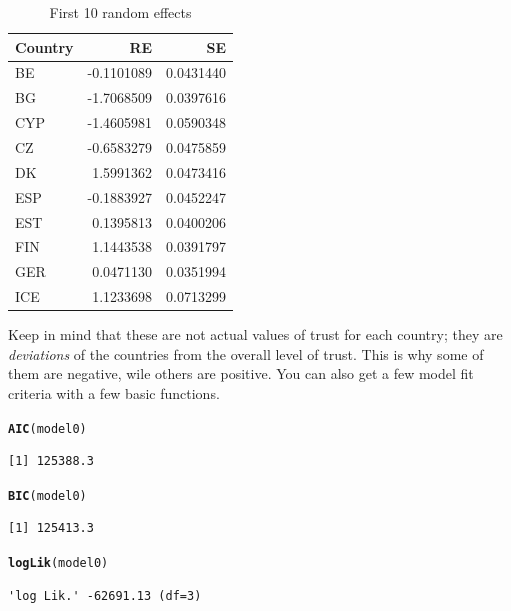 \documentclass[12pt,english]{article}\usepackage[]{graphicx}\usepackage[usenames, dvipsnames]{xcolor}
\makeatletter
\newcommand{\hlstd}[1]{\textcolor[rgb]{0.345,0.345,0.345}{#1}}%
\newcommand{\hlkwd}[1]{\textcolor[rgb]{0.737,0.353,0.396}{\textbf{#1}}}%
\newenvironment{kframe}{%
 \def\at@end@of@kframe{}%
 \ifinner\ifhmode%
  \def\at@end@of@kframe{\end{minipage}}%
  \begin{minipage}{\columnwidth}%
 \fi\fi%
 \def\FrameCommand##1{\hskip\@totalleftmargin \hskip-\fboxsep
 \colorbox{shadecolor}{##1}\hskip-\fboxsep
     \hskip-\linewidth \hskip-\@totalleftmargin \hskip\columnwidth}%
 \MakeFramed {\advance\hsize-\width
   \@totalleftmargin\z@ \linewidth\hsize
   \@setminipage}}%
 {\par\unskip\endMakeFramed%
 \at@end@of@kframe}
\newenvironment{knitrout}{}{} %
\makeatother
\begin{document}
\begin{table}[!h]

\caption{\label{tab:ch-8}First 10 random effects}
\centering
\begin{tabular}[t]{lrr}
\toprule
Country & RE & SE\\
\midrule
BE & -0.1101089 & 0.0431440\\
BG & -1.7068509 & 0.0397616\\
CYP & -1.4605981 & 0.0590348\\
CZ & -0.6583279 & 0.0475859\\
DK & 1.5991362 & 0.0473416\\
ESP & -0.1883927 & 0.0452247\\
EST & 0.1395813 & 0.0400206\\
FIN & 1.1443538 & 0.0391797\\
GER & 0.0471130 & 0.0351994\\
ICE & 1.1233698 & 0.0713299\\
\bottomrule
\end{tabular}
\end{table}



Keep in mind that these are not actual values of trust for each country; they are \textit{deviations} of the countries from the overall level of trust. This is why some of them are negative, wile others are positive. You can also get a few model fit criteria with a few basic functions.

\begin{knitrout}
\color{fgcolor}\begin{kframe}
\begin{alltt}
\hlkwd{AIC}\hlstd{(model0)}
\end{alltt}
\begin{verbatim}
[1] 125388.3
\end{verbatim}
\begin{alltt}
\hlkwd{BIC}\hlstd{(model0)}
\end{alltt}
\begin{verbatim}
[1] 125413.3
\end{verbatim}
\begin{alltt}
\hlkwd{logLik}\hlstd{(model0)}
\end{alltt}
\begin{verbatim}
'log Lik.' -62691.13 (df=3)
\end{verbatim}
\end{kframe}
\end{knitrout}
\end{document}
